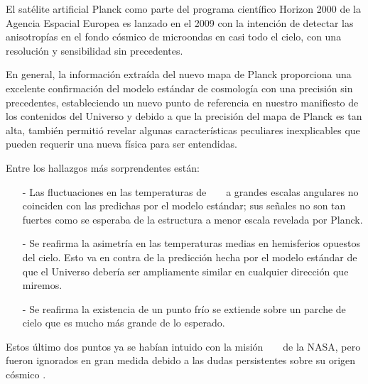 El satélite artificial Planck como parte del programa científico Horizon 2000 de la Agencia Espacial Europea es lanzado en el 2009 con la intención de detectar las anisotropías en el fondo cósmico de microondas en casi todo el cielo, con una resolución y sensibilidad sin precedentes. 


En general, la información extraída del nuevo mapa de Planck proporciona una excelente confirmación del modelo estándar de cosmología con una precisión sin precedentes, estableciendo un nuevo punto de referencia en nuestro manifiesto de los contenidos del Universo y debido a que la precisión del mapa de Planck es tan alta, también permitió revelar algunas características peculiares inexplicables que pueden requerir una nueva física para ser entendidas.

Entre los hallazgos más sorprendentes están:
\begin{itemize}
\item[-] Las fluctuaciones en las temperaturas de ~ \CMB ~ a grandes escalas angulares no coinciden con las predichas por el modelo estándar; sus señales no son tan fuertes como se esperaba de la estructura a menor escala revelada por Planck.
\item[-] Se reafirma la asimetría en las temperaturas medias en hemisferios opuestos del cielo. Esto va en contra de la predicción hecha por el modelo estándar de que el Universo debería ser ampliamente similar en cualquier dirección que miremos.
\item[-] Se reafirma la existencia de un punto frío se extiende sobre un parche de cielo que es mucho más grande de lo esperado.
\end{itemize}
Estos último dos puntos ya se habían intuido con la misión ~ \WMAP ~ de la NASA, pero fueron ignorados en gran medida debido a las dudas persistentes sobre su origen cósmico \citep{planck_collaboration_planck_2019}.

